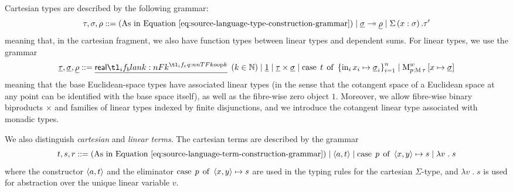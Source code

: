 \documentclass[11pt,a4paper]{article}
\theoremstyle{definition}
\theoremstyle{remark}
\providecommand{\N}{\mathbb{N}}
\providecommand{\lintype}[1]{\underline{#1}}
\providecommand{\linto}{\multimap}
\begin{document}
Cartesian types are described by the following grammar:
\begin{equation}
  \label{eq:target-language-cartesian-type-construction-grammar}
  \tau, \sigma, \rho
  ::=
  \left( \text{As in Equation~\eqref{eq:source-language-type-construction-grammar}} \right)
  \mid
  \lintype{\sigma} \linto \lintype{\rho}
  \mid
  \Sigma \left( x : \sigma \right) . \tau'
\end{equation}
meaning that, in the cartesian fragment, we also have function types between linear types and dependent sums. For linear types, we use the grammar
\begin{equation}
  \label{eq:target-language-linear-type-construction-grammar}
  \lintype{\tau}, \lintype{\sigma}, \lintype{\rho} ::=
  \lintype{\srcreal[k]}
  \; \left( k \in \N \right)
  \mid
  \lintype{1}
  \mid
  \lintype{\tau} \times \lintype{\sigma}
  \mid
  \opn[b]{case} \; t \; \opn[b]{of} \; \left\{ \opn[b]{in}_{i} x_{i} \mapsto \lintype{\sigma}_{i} \right\}_{i = 1}^{n}
  \mid
  \opn[b]{M}^{w}_{p : \opn[b]{M} \tau}
  \left[ x \mapsto \lintype{ \sigma } \right]
\end{equation}
meaning that the base Euclidean-space types have associated linear types (in the sense that the cotangent space of a Euclidean space at any point can be identified with the base space itself), as well as the fibre-wise zero object \( 1 \). Moreover, we allow fibre-wise binary biproducts \( \times \) and families of linear types indexed by finite disjunctions, and we introduce the cotangent linear type associated with monadic types.

We also distinguish \emph{cartesian} and \emph{linear terms}. The cartesian terms are described by the grammar
\begin{equation}
  \label{eq:target-language-cartesian-term-construction-grammar}
  t, s, r ::=
  \left( \text{As in Equation~\eqref{eq:source-language-term-construction-grammar}} \right)
  \mid
  \tuple{ a, t }
  \mid
  \opn[b]{case} \; p \; \opn[b]{of} \; \tuple{ x, y } \mapsto s
  \mid
  \lambda v \; . \; s
\end{equation}
where the constructor \( \left\langle  a, t \right\rangle \) and the eliminator \( \opn[b]{case} \; p \; \opn[b]{of} \; \tuple{ x, y } \mapsto s \) are used in the typing rules for the cartesian \( \Sigma \)-type, and \( \lambda v \; . \; s \) is used for abstraction over the unique linear variable \( v \).
\end{document}
